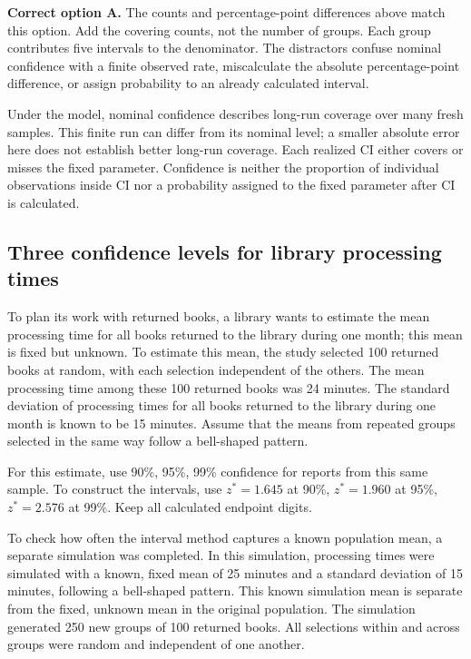 \textbf{Correct option A.} The counts and percentage-point differences above match this option. Add the covering counts, not the number of groups. Each group contributes five intervals to the denominator. The distractors confuse nominal confidence with a finite observed rate, miscalculate the absolute percentage-point difference, or assign probability to an already calculated interval.

Under the model, nominal confidence describes long-run coverage over many fresh samples. This finite run can differ from its nominal level; a smaller absolute error here does not establish better long-run coverage. Each realized $\mathrm{CI}$ either covers or misses the fixed parameter. Confidence is neither the proportion of individual observations inside $\mathrm{CI}$ nor a probability assigned to the fixed parameter after $\mathrm{CI}$ is calculated.
\par\nopagebreak[4]
\par\vspace{3mm}
\clearpage
\subsection{Three confidence levels for library processing times}
\label{prob:c2-compare-three}

To plan its work with returned books, a library wants to estimate the mean processing time for all books returned to the library during one month; this mean is fixed but unknown. To estimate this mean, the study selected 100 returned books at random, with each selection independent of the others. The mean processing time among these 100 returned books was 24 minutes. The standard deviation of processing times for all books returned to the library during one month is known to be 15 minutes. Assume that the means from repeated groups selected in the same way follow a bell-shaped pattern.

For this estimate, use 90\%, 95\%, 99\% confidence for reports from this same sample. To construct the intervals, use $z^*=1.645$ at 90\%, $z^*=1.960$ at 95\%, $z^*=2.576$ at 99\%. Keep all calculated endpoint digits.

To check how often the interval method captures a known population mean, a separate simulation was completed. In this simulation, processing times were simulated with a known, fixed mean of 25 minutes and a standard deviation of 15 minutes, following a bell-shaped pattern. This known simulation mean is separate from the fixed, unknown mean in the original population. The simulation generated 250 new groups of 100 returned books. All selections within and across groups were random and independent of one another.

